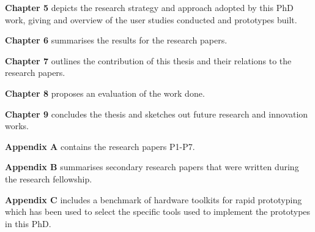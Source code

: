 \textbf{Chapter 5} depicts the research strategy and approach adopted by this PhD work, giving and overview of the user studies conducted and prototypes built.

\textbf{Chapter 6} summarises the results for the research papers.

\textbf{Chapter 7} outlines the contribution of this thesis and their relations to the research papers.

\textbf{Chapter 8} proposes an evaluation of the work done.

\textbf{Chapter 9} concludes the thesis and sketches out future research and innovation works.

\textbf{Appendix A} contains the research papers P1-P7.

\textbf{Appendix B} summarises secondary research papers that were written during the research fellowship.

\textbf{Appendix C} includes a benchmark of hardware toolkits for rapid prototyping which has been used to select the specific tools used to implement the prototypes in this PhD. 
